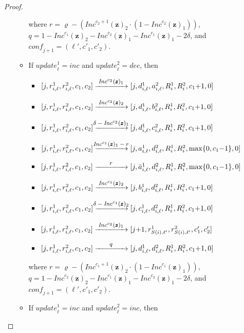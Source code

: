 \documentclass[a4paper,UKenglish,cleveref, autoref, thm-restate]{lipics-v2021}
\newcommand{\tran}[1]{\xrightarrow{\makebox[4em]{\footnotesize$#1$}}}
\newcommand{\INC}{\mathit{Inc}}
\renewcommand{\vec}[1]{\pmb{#1}}
\newcommand{\update}{\textit{update}}
\newcommand{\Dec}{\textit{dec}}
\newcommand{\Inc}{\textit{inc}}
\newcommand{\conf}{\textit{conf}}
\newcommand{\vv}[1]{\INC^{#1}(\vec{z})}
\begin{document}
\begin{proof}
\begin{itemize}
\begin{itemize}
     where $r = \varrho - (\vv{c_2+1}_2 \cdot (1-\vv{c_2}_1))$,
     $q = 1 - \vv{c_1}_2 - \vv{c_2}_1 - \vv{c_1}_1 - 2\delta$,
     and $\conf_{j+1}= (\ell',c'_1,c'_2)$.
    \item If $\update_\ell^1 = \Inc$ and $\update_\ell^2 = \Dec$, then 
     \begin{itemize}
        \item $[j,r^1_{i,\ell},r^2_{i,\ell},c_1,c_2] \tran{\vv{c_2}_1} 
               [j,d^1_{i,\ell},a^2_{i,\ell},R_i^1,R_i^2,c_1{+}1,0]$
        \item $[j,r^1_{i,\ell},r^2_{i,\ell},c_1,c_2] \tran{\vv{c_2}_2} 
               [j,d^1_{i,\ell},b^2_{i,\ell},R_i^1,R_i^2,c_1{+}1,0]$    
        \item $[j,r^1_{i,\ell},r^2_{i,\ell},c_1,c_2] \tran{\delta- \vv{c_2}_1}
               [j,d^1_{i,\ell},c^2_{i,\ell},R_i^1,R_i^2,c_1{+}1,0]$
\item $[j,r^1_{i,\ell},r^2_{i,\ell},c_1,c_2] \tran{\vv{c_1}_1 - r} 
               [j,a^1_{i,\ell},d^2_{i,\ell},R_i^1,R_i^2,\max\{0,c_1{-}1\},0]$
        \item $[j,r^1_{i,\ell},r^2_{i,\ell},c_1,c_2] \tran{r} 
               [j,\bar{a}^1_{i,\ell},d^2_{i,\ell},R_i^1,R_i^2,\max\{0,c_1{-}1\},0]$
        \item $[j,r^1_{i,\ell},r^2_{i,\ell},c_1,c_2] \tran{\vv{c_1}_2} 
               [j,b^1_{i,\ell},d^2_{i,\ell},R_i^1,R_i^2,c_1{+}1,0]$    
        \item $[j,r^1_{i,\ell},r^2_{i,\ell},c_1,c_2] \tran{\delta- \vv{c_1}_2} 
               [j,c^1_{i,\ell},d^2_{i,\ell},R_i^1,R_i^2,c_1{+}1,0]$
        \item $[j,r^1_{i,\ell},r^2_{i,\ell},c_1,c_2] \tran{\vv{c_2}_1}  
               [j{+}1,r^1_{S(i),\ell'},r^2_{S(i),\ell'},c'_1,c'_2]$
        \item $[j,r^1_{i,\ell},r^2_{i,\ell},c_1,c_2] \tran{q} [j,d^1_{i,\ell},d^2_{i,\ell},R_i^1,R_i^2,c_1{+}1,0]$    
\end{itemize}
    where $r = \varrho - (\vv{c_1+1}_2 \cdot (1-\vv{c_1}_1))$,
    $q = 1 - \vv{c_2}_2 - \vv{c_1}_1 - \vv{c_2}_1 - 2\delta$,
    and $\conf_{j+1}= (\ell',c'_1,c'_2)$.
    \item If $\update_\ell^1 = \Inc$ and $\update_\ell^2 = \Inc$, then 
\end{itemize}
\end{itemize}
\end{proof}
\end{document}
